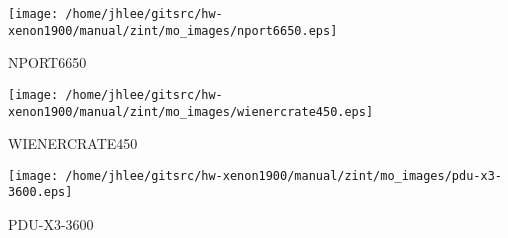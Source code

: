 \noindent
\vspace{1cm}
\begin{minipage}{.2\textwidth}
\begin{center}
\texttt{[image: /home/jhlee/gitsrc/hw-xenon1900/manual/zint/mo\_images/nport6650.eps]}
\end{center}
\end{minipage}
\begin{minipage}{.7\textwidth}
NPORT6650
\end{minipage}


\noindent
\vspace{1cm}
\begin{minipage}{.2\textwidth}
\begin{center}
\texttt{[image: /home/jhlee/gitsrc/hw-xenon1900/manual/zint/mo\_images/wienercrate450.eps]}
\end{center}
\end{minipage}
\begin{minipage}{.7\textwidth}
WIENERCRATE450
\end{minipage}


\noindent
\vspace{1cm}
\begin{minipage}{.2\textwidth}
\begin{center}
\texttt{[image: /home/jhlee/gitsrc/hw-xenon1900/manual/zint/mo\_images/pdu-x3-3600.eps]}
\end{center}
\end{minipage}
\begin{minipage}{.7\textwidth}
PDU-X3-3600
\end{minipage}


